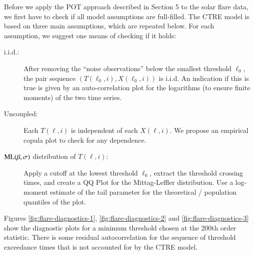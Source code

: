 \documentclass[]{elsarticle} %
\begin{document}
Before we apply the POT approach described in Section 5 to the solar
flare data, we first have to check if all model assumptions are
full-filled. The CTRE model is based on three main assumptions, which
are repeated below. For each assumption, we suggest one means of
checking if it holds:

\begin{description}
\item[i.i.d.:]
After removing the ``noise observations'' below the smallest threshold
\(\ell_0\), the pair sequence \((T(\ell_0, i), X(\ell_0,i))\) is i.i.d.
An indication if this is true is given by an auto-correlation plot for
the logarithms (to ensure finite moments) of the two time series.
\item[Uncoupled:]
Each \(T(\ell, i)\) is independent of each \(X(\ell, i)\). We propose an
empirical copula plot to check for any dependence.
\item[\({\rm ML}(\beta, \sigma)\) distribution of \(T(\ell, i)\):]
Apply a cutoff at the lowest threshold \(\ell_0\), extract the threshold
crossing times, and create a QQ Plot for the Mittag-Leffler
distribution. Use a log-moment estimate of the tail parameter for the
theoretical / population quantiles of the plot.
\end{description}

Figures \ref{fig:flare-diagnostics-1}, \ref{fig:flare-diagnostics-2} and
\ref{fig:flare-diagnostics-3} show the diagnostic plots for a minimum
threshold chosen at the 200th order statistic. There is some residual
autocorrelation for the sequence of threshold exceedance times that is
not accounted for by the CTRE model.
\end{document}
